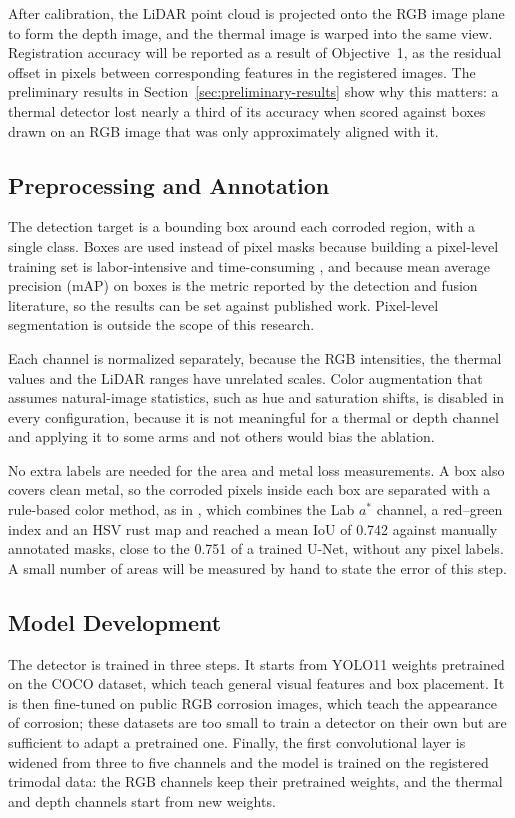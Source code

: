 After calibration, the LiDAR point cloud is projected onto the RGB image plane to
form the depth image, and the thermal image is warped into the same view.
Registration accuracy will be reported as a result of Objective~1, as the
residual offset in pixels between corresponding features in the registered
images. The preliminary results in Section~\ref{sec:preliminary-results} show
why this matters: a thermal detector lost nearly a third of its accuracy when
scored against boxes drawn on an RGB image that was only approximately aligned
with it.

\subsection{Preprocessing and Annotation}
\label{sec:annotation}

The detection target is a bounding box around each corroded region, with a
single class. Boxes are used instead of pixel masks because building a
pixel-level training set is labor-intensive and time-consuming \citep{Lim2021},
and because mean average precision (mAP) on boxes is the metric reported by the
detection and fusion literature, so the results can be set against published
work. Pixel-level segmentation is outside the scope of this research.

Each channel is normalized separately, because the RGB intensities, the thermal
values and the LiDAR ranges have unrelated scales. Color augmentation that
assumes natural-image statistics, such as hue and saturation shifts, is disabled
in every configuration, because it is not meaningful for a thermal or depth
channel and applying it to some arms and not others would bias the ablation.

No extra labels are needed for the area and metal loss measurements. A box also
covers clean metal, so the corroded pixels inside each box are separated with a
rule-based color method, as in \citet{Alvani2026}, which combines the Lab
$a^*$ channel, a red--green index and an HSV rust map and reached a mean IoU of
0.742 against manually annotated masks, close to the 0.751 of a trained U-Net,
without any pixel labels. A small number of areas will be measured by hand to
state the error of this step.

\subsection{Model Development}
\label{sec:model}

The detector is trained in three steps. It starts from YOLO11 weights pretrained
on the COCO dataset, which teach general visual features and box placement. It
is then fine-tuned on public RGB corrosion images, which teach the appearance of
corrosion; these datasets are too small to train a detector on their own but are
sufficient to adapt a pretrained one. Finally, the first convolutional layer is
widened from three to five channels and the model is trained on the registered
trimodal data: the RGB channels keep their pretrained weights, and the thermal
and depth channels start from new weights.

